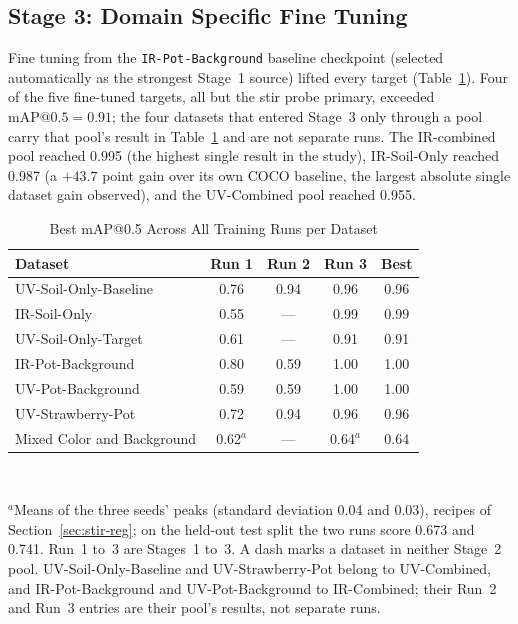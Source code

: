 ﻿\documentclass[journal]{IEEEtran}
\begin{document}
\subsection{Stage 3: Domain Specific Fine Tuning}
Fine tuning from the \texttt{IR-Pot-Background} baseline checkpoint (selected automatically as the strongest Stage~1 source) lifted every target (Table~\ref{tab:best}). Four of the five fine-tuned targets, all but the stir probe primary, exceeded $\text{mAP@0.5}=0.91$; the four datasets that entered Stage~3 only through a pool carry that pool's result in Table~\ref{tab:best} and are not separate runs. The IR-combined pool reached 0.995 (the highest single result in the study), IR-Soil-Only reached 0.987 (a $+43.7$ point gain over its own COCO baseline, the largest absolute single dataset gain observed), and the UV-Combined pool reached 0.955.

\begin{table}[!t]
\renewcommand{\arraystretch}{1.3}
\caption{Best mAP@0.5 Across All Training Runs per Dataset}
\label{tab:best}
\centering
\begin{tabular}{l c c c c}
\toprule
\textbf{Dataset} & \textbf{Run 1} & \textbf{Run 2} & \textbf{Run 3} & \textbf{Best} \\
\midrule
UV-Soil-Only-Baseline & 0.76 & 0.94 & 0.96 & 0.96 \\
IR-Soil-Only & 0.55 & --- & 0.99 & 0.99 \\
UV-Soil-Only-Target & 0.61 & --- & 0.91 & 0.91 \\
IR-Pot-Background & 0.80 & 0.59 & 1.00 & 1.00 \\
UV-Pot-Background & 0.59 & 0.59 & 1.00 & 1.00 \\
UV-Strawberry-Pot & 0.72 & 0.94 & 0.96 & 0.96 \\
Mixed Color and Background & 0.62$^{a}$ & --- & 0.64$^{a}$ & 0.64 \\
\bottomrule
\end{tabular}
\\[2pt]
\parbox{\columnwidth}{\footnotesize $^{a}$Means of the three seeds' peaks (standard deviation 0.04 and 0.03), recipes of Section~\ref{sec:stir-reg}; on the held-out test split the two runs score 0.673 and 0.741. Run~1 to~3 are Stages~1 to~3. A dash marks a dataset in neither Stage~2 pool. UV-Soil-Only-Baseline and UV-Strawberry-Pot belong to UV-Combined, and IR-Pot-Background and UV-Pot-Background to IR-Combined; their Run~2 and Run~3 entries are their pool's results, not separate runs.}
\end{table}
\end{document}
